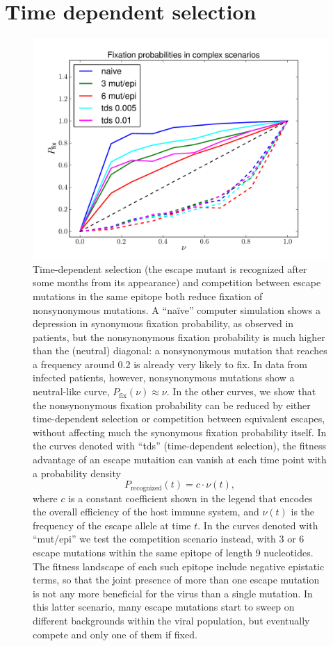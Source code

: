 \documentclass[rmp]{revtex4}
\begin{document}
\section{Time dependent selection}
\begin{figure}[h]
\begin{center}
\includegraphics[width=0.8\linewidth]{simulations_graduallyepitopesandtimeselec}
\caption{Time-dependent selection (the escape mutant is recognized after some
months from its appearance) and competition between escape mutations in the same
epitope both reduce fixation of nonsynonymous mutations. A ``na\"ive'' computer
simulation shows a depression in synonymous fixation probability, as observed in
patients, but the nonsynonymous fixation probability is much higher than the
(neutral) diagonal: a nonsynonymous mutation that reaches a frequency around
0.2 is already very likely to fix. In data from infected patients, however,
nonsynonymous mutations show a neutral-like curve,
$P_\text{fix}(\nu) \approx \nu$. In the other curves, we show that the
nonsynonymous fixation probability can be reduced by either time-dependent
selection or competition between equivalent escapes, without affecting much the
synonymous fixation probability itself.
In the curves denoted with ``tds'' (time-dependent selection), the fitness advantage of
an escape mutaition can vanish at each time point with a probability density
\[ P_\text{recognized}(t) = c \cdot \nu(t), \]
where $c$ is a constant coefficient shown in the legend that encodes the overall
efficiency of the host immune system, and $\nu(t)$ is the frequency of the
escape allele at time $t$.
In the curves denoted with ``mut/epi'' we test the
competition scenario instead, with 3 or 6 escape mutations within the same
epitope of length 9 nucleotides. The fitness landscape of each such epitope
include negative epistatic terms, so that the joint presence of more than one
escape mutation is not any more beneficial for the virus than a single mutation.
In this latter scenario, many escape mutations start to sweep on different
backgrounds within the viral population, but eventually compete and only one of
them if fixed.}
\label{fig:tds_wec}
\end{center}
\end{figure}
\end{document}
